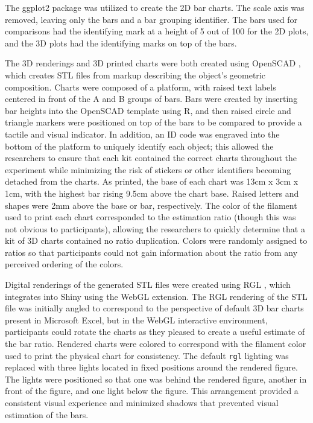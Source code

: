 \documentclass[letterpaper,inpress,dvipsnames]{jdsart}
\begin{document}
The ggplot2 \citep{ggplot2} package was utilized to create the 2D bar charts.
The scale axis was removed, leaving only the bars and a bar grouping identifier.
The bars used for comparisons had the identifying mark at a height of 5 out of 100 for the 2D plots, and the 3D plots had the identifying marks on top of the bars.

The 3D renderings and 3D printed charts were both created using OpenSCAD \citep{kintelOpenSCADDocumentation2023}, which creates STL files from markup describing the object's geometric composition.
Charts were composed of a platform, with raised text labels centered in front of the A and B groups of bars. Bars were created by inserting bar heights into the OpenSCAD template using R, and then raised circle and triangle markers were positioned on top of the bars to be compared to provide a tactile and visual indicator.
In addition, an ID code was engraved into the bottom of the platform to uniquely identify each object; this allowed the researchers to ensure that each kit contained the correct charts throughout the experiment while minimizing the risk of stickers or other identifiers becoming detached from the charts.
As printed, the base of each chart was 13cm x 3cm x 1cm, with the highest bar rising 9.5cm above the chart base.
Raised letters and shapes were 2mm above the base or bar, respectively.
The color of the filament used to print each chart corresponded to the estimation ratio (though this was not obvious to participants), allowing the researchers to quickly determine that a kit of 3D charts contained no ratio duplication.
Colors were randomly assigned to ratios so that participants could not gain information about the ratio from any perceived ordering of the colors.

Digital renderings of the generated STL files were created using RGL \citep{rgl}, which integrates into Shiny \citep{shiny} using the WebGL \citep{mozillafoundationWebGL2D3D2023} extension.
The RGL rendering of the STL file was initially angled to correspond to the perspective of default 3D bar charts present in Microsoft Excel, but in the WebGL interactive environment, participants could rotate the charts as they pleased to create a useful estimate of the bar ratio.
Rendered charts were colored to correspond with the filament color used to print the physical chart for consistency.
The default \texttt{rgl} lighting was replaced with three lights located in fixed positions around the rendered figure.
The lights were positioned so that one was behind the rendered figure, another in front of the figure, and one light below the figure.
This arrangement provided a consistent visual experience and minimized shadows that prevented visual estimation of the bars.
\end{document}
